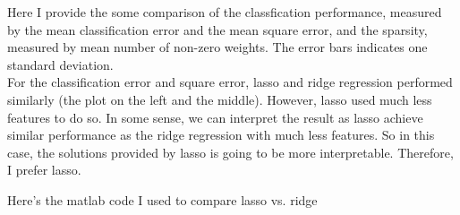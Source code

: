 \documentclass[paper=a4, fontsize=11pt]{scrartcl} %
\numberwithin{equation}{section} %
\numberwithin{figure}{section} %
\numberwithin{table}{section} %
\begin{document}
Here I provide the some comparison of the classfication performance, measured by the mean classification error and the mean square error, and the sparsity, measured by mean number of non-zero weights. The error bars indicates one standard deviation. \\

For the classification error and square error, lasso and ridge regression performed similarly (the plot on the left and the middle). However, lasso used much less features to do so. In some sense, we can interpret the result as lasso achieve similar performance as the ridge regression with much less features. So in this case, the solutions provided by lasso is going to be more interpretable. Therefore, I prefer lasso. 

\newpage

Here's the matlab code I used to compare lasso vs. ridge
\end{document}
